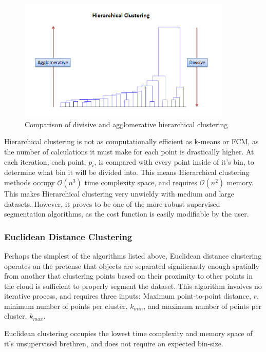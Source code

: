 \documentclass[12pt]{drexelthesis}
\let\Oldsubsubsection\subsubsection
\renewcommand{\subsubsection}{\FloatBarrier\Oldsubsubsection}
\begin{document}
\begin{figure}[!ht]
\centering
\includegraphics[width=4in]{divisiveAgglomerative.png}
\caption[Comparison of divisive and agglomerative clustering methods]{Comparison of divisive and agglomerative hierarchical clustering}
\end{figure}

Hierarchical clustering is not as computationally efficient as k-means or FCM, as the number of calculations it must make for each point is drastically higher. At each iteration, each point, $p_{i}$, is compared with every point inside of it's bin, to determine what bin it will be divided into. This means Hierarchical clustering methods occupy $\mathcal{O}(n^{3})$ time complexity space, and requires $\mathcal{O}(n^{2})$ memory. This makes Hierarchical clustering very unwieldy with medium and large datasets. However, it proves to be one of the more robust supervised segmentation algorithms, as the cost function is easily modifiable by the user.


\subsubsection{Euclidean Distance Clustering}
Perhaps the simplest of the algorithms listed above, Euclidean distance clustering operates on the pretense that objects are separated significantly enough spatially from another that clustering points based on their proximity to other points in the cloud is sufficient to properly segment the dataset. This algorithm involves no iterative process, and requires three inputs: Maximum point-to-point distance, $r$, minimum number of points per cluster, $k_{min}$, and maximum number of points per cluster, $k_{max}$.

Euclidean clustering occupies the lowest time complexity and memory space of it's unsupervised brethren, and does not require an expected bin-size.
\end{document}
